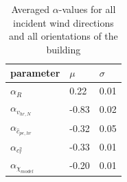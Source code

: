 \begin{table}[htb!]
	\centering
	\caption{Averaged $\alpha$-values for all incident wind directions and all orientations of the building}
	\label{alpha-values}
	\begin{tabular}{|l|l|l|}
		\hline
		parameter              & $\mu$ & $\sigma$ \\ \hline
		$\alpha_R$    & 0.22 & 0.01  \\ \hline
		$\alpha_{v_{hr,N}}$             & -0.83 & 0.02  \\ \hline
		$\alpha_{\hat{c}_{pe,hr}}$      & -0.32 & 0.05  \\ \hline
		$\alpha_{c_r^2}$                & -0.33 & 0.01  \\ \hline
		$\alpha_{\chi_{model}}$         & -0.20 & 0.01  \\ \hline
	\end{tabular}
\end{table}

